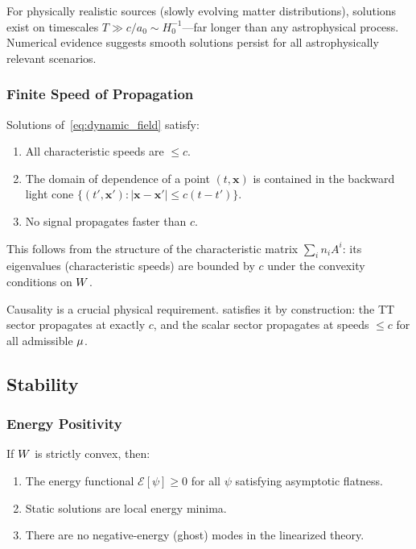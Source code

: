 For physically realistic sources (slowly evolving matter distributions), 
solutions exist on timescales $T \gg c/a_0 \sim H_0^{-1}$---far 
longer than any astrophysical process. Numerical evidence suggests smooth 
solutions persist for all astrophysically relevant scenarios.

\subsubsection{Finite Speed of Propagation}

\begin{theorem}[Causality]\label{thm:causality}
Solutions of~\eqref{eq:dynamic_field} satisfy:
\begin{enumerate}
\item All characteristic speeds are $\leq c$.
\item The domain of dependence of a point $(t, \mathbf{x})$ is contained 
in the backward light cone $\{(t', \mathbf{x}'): |\mathbf{x} - \mathbf{x}'| 
\leq c(t - t')\}$.
\item No signal propagates faster than $c$.
\end{enumerate}
\end{theorem}

This follows from the structure of the characteristic matrix 
$\sum_i n_i A^i$: its eigenvalues (characteristic speeds) are bounded 
by $c$ under the convexity conditions on $W$.

Causality is a crucial physical requirement. \DFD satisfies it by 
construction: the TT sector propagates at exactly $c$, and the scalar 
sector propagates at speeds $\leq c$ for all admissible $\mu$.

\subsection{Stability}\label{sec:stability}

\subsubsection{Energy Positivity}

\begin{theorem}\label{thm:positive_energy}
If $W$ is strictly convex, then:
\begin{enumerate}
\item The energy functional $\mathcal{E}[\psi] \geq 0$ for all 
$\psi$ satisfying asymptotic flatness.
\item Static solutions are local energy minima.
\item There are no negative-energy (ghost) modes in the linearized theory.
\end{enumerate}
\end{theorem}

